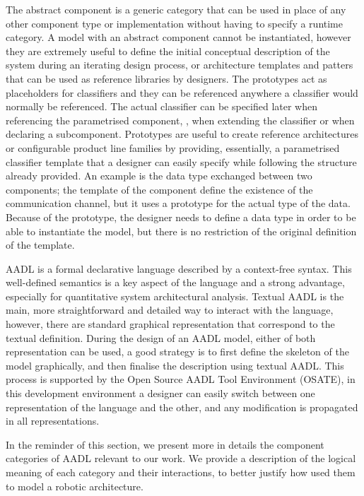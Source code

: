 The abstract component is a generic category that can be used in place of any other component type or implementation without having to specify a runtime category. A model with an abstract component cannot be instantiated, however they are extremely useful to define the initial conceptual description of the system during an iterating design process, or architecture templates and patters that can be used as reference libraries by designers. The prototypes act as placeholders for classifiers and they can be referenced anywhere a classifier would normally be referenced. The actual classifier can be specified later when referencing the parametrised component, \eg, when extending the classifier or when declaring a subcomponent. Prototypes are useful to create reference architectures or configurable product line families by providing, essentially, a parametrised classifier template that a designer can easily specify while following the structure already provided. An example is the data type exchanged between two components; the template of the component define the existence of the communication channel, but it uses a prototype for the actual type of the data. Because of the prototype, the designer needs to define a data type in order to be able to instantiate the model, but there is no restriction of the original definition of the template.

AADL is a formal declarative language described by a context-free syntax. This well-defined semantics is a key aspect of the language and a strong advantage, especially for quantitative system architectural analysis. Textual AADL is the main, more straightforward and detailed way to interact with the language, however, there are standard graphical representation that correspond to the textual definition. During the design of an AADL model, either of both representation can be used, a good strategy is to first define the skeleton of the model graphically, and then finalise the description using textual AADL. This process is supported by the Open Source AADL Tool Environment (OSATE), in this development environment a designer can easily switch between one representation of the language and the other, and any modification is propagated in all representations.

In the reminder of this section, we present more in details the component categories of AADL relevant to our work. We provide a description of the logical meaning of each category and their interactions, to better justify how used them to model a robotic architecture.

